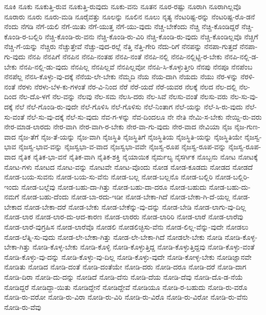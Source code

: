 {ನೂಕಿ
ನೂಕು
ನೂಕುತ್ತಿ-ರುವ
ನೂಕುತ್ತಿ-ರುವುದು
ನೂಕು-ವನು
ನೂತನ
ನೂರ-ರಷ್ಟು
ನೂರಾಗಿ
ನೂರಾಗಿಲ್ಲವೊ
ನೂರಾರು
ನೂರು
ನೂರು-ಮಡಿ
ನೂರೈವತ್ತು
ನೂಲನ್ನು
ನೂಲಿನ
ನೂಲು
ನೃತ್ಯ
ನೆಂಟರಿಷ್ಟ-ರನ್ನು
ನೆಂಟರಿಷ್ಟ-ರೊ-ಡನೆ
ನೆಂದು
ನೆಗಡಿ
ನೆಗೆ-ಯಲಿ
ನೆಗೆ-ಯಿತು
ನೆಗೆ-ಯುತ್ತ
ನೆಗೆ-ಯು-ವುದು
ನೆಚ್ಚ-ಬೇಕೆಂದು
ನೆಚ್ಚಿ
ನೆಚ್ಚಿ-ಕೊಂಡಿದ್ದರೆ
ನೆಚ್ಚಿ-ಕೊಂಡಿ-ರ-ಬಲ್ಲಿರಿ
ನೆಚ್ಚಿ-ಕೊಂಡಿ-ರು-ವನು
ನೆಚ್ಚಿ-ಕೊಂಡಿ-ರು-ವಿರಿ
ನೆಚ್ಚಿ-ಕೊಂಡಿ-ರು-ವುದು
ನೆಚ್ಚಿ-ಕೊಂಡಿಲ್ಲವೊ
ನೆಚ್ಚಿಗೆ
ನೆಚ್ಚಿ-ಗೆ-ಯನ್ನು
ನೆಚ್ಚಿರು
ನೆಚ್ಚುತ್ತೇವೆ
ನೆಚ್ಚು-ವುದ-ರಲ್ಲೆ
ನೆತ್ತಿ
ನೆತ್ತಿ-ಗೇರಿ
ನೆದು-ರಿಗೆ
ನೆನಪನ್ನು
ನೆನಪಾ-ಗುತ್ತದೆ
ನೆನಪಾ-ಗು-ವುದು
ನೆನಪಿ
ನೆನಪಿಗೆ
ನೆನಪಿನ
ನೆನಪಿ-ನಂತಹ
ನೆನಪಿ-ನಂತೆ
ನೆನಪಿ-ನಲ್ಲಿ
ನೆನಪಿ-ನಲ್ಲಿಟ್ಟಿ-ರ-ಬೇಕು
ನೆನಪಿ-ನಲ್ಲಿ-ಡ-ಬೇಕು
ನೆನಪಿ-ನಲ್ಲಿ-ಡು-ವುದು
ನೆನಪಿಲ್ಲ
ನೆನಪಿಲ್ಲವೆ
ನೆನಪಿಲ್ಲವೋ
ನೆನಪಿ-ಸಿ-ಕೊಳ್ಳುತ್ತೀರಿ
ನೆನಪು
ನೆನಪೂ
ನೆನಪೆಂಬ
ನೆನಪೆಲ್ಲ
ನೆನಸಿ-ಕೊಳ್ಳು-ವು-ದಕ್ಕೆ
ನೆನೆಯ-ಲೇ-ಬೇಕು
ನೆಮ್ಮದಿ
ನೆಯ
ನೆಯ-ದಾಗಿ
ನೆಯದು
ನೆಯು
ನೆರ-ಳನ್ನು
ನೆರಳಿ-ನಂತೆ
ನೆರಳು
ನೆರಳು-ಬೆಳ-ಕು-ಗಳಂತೆ
ನೆರ-ವಿ-ನಿಂದ
ನೆರೆ
ನೆರೆ-ಯದೆ
ನೆರೆ-ಯವರ
ನೆಲಕ್ಕೆ
ನೆಲದ
ನೆಲ-ದಲ್ಲಿ
ನೆಲ-ದಿಂದ
ನೆಲ-ದೊ-ಳಗೆ
ನೆಲ-ವನ್ನು
ನೆಲವು
ನೆಲ-ಸಮ
ನೆಲಸಿ-ದರು
ನೆಲ-ಸಿವೆ
ನೆಲಸು-ವಂತೆ
ನೆಲಸು-ವರು
ನೆಲ-ಸು-ವು-ದಕ್ಕೆ
ನೆಲೆ
ನೆಲೆ-ಗೊಂಡಿ-ರು-ವುದೇ
ನೆಲೆ-ಗೊಳಿಸಿ
ನೆಲೆ-ಗೊಳಿಸು
ನೆಲೆ-ನಿಂತಾಗ
ನೆಲೆ-ಯನ್ನು
ನೆಲೆ-ಸಿ-ರು-ವುದು
ನೆಲೆ-ಸು-ವಂತೆ
ನೆಲೆ-ಸು-ವು-ದಕ್ಕೆ
ನೆಲೆ-ಸು-ವುದು
ನೆವ-ಗ-ಳನ್ನು
ನೆವ-ದಿಂದಲೂ
ನೇ
ನೇತಿ
ನೇಮಿ-ಸ-ಬೇಕು
ನೇಯ್ದಿ-ರು-ವರು
ನೇರ-ಮಾಡ-ಲಾರದು
ನೇರ-ವಾಗಿ
ನೇರ-ವಾಗಿ-ರ-ಬೇಕು
ನೇರ-ವಾ-ಗು-ವುದು
ನೇರ-ವಾದ
ನೇವಿಯಾ
ನೈಜ
ನೈಜ-ಗುಣ-ವಾದ
ನೈಜ-ತೆಗೆ
ನೈಜ-ತೆ-ಯನ್ನು
ನೈಜ-ವಾಗಿ
ನೈಜಸ್ಥಿತಿ
ನೈಜಸ್ಥಿತಿಗೆ
ನೈಜಸ್ಥಿತಿಯ
ನೈಜಸ್ಥಿತಿ-ಯನ್ನು
ನೈಜಸ್ಥಿತಿಯೇ
ನೈಜಸ್ವ-ಭಾವ
ನೈಜಸ್ವ-ಭಾವ-ವನ್ನು
ನೈಜಸ್ವಭಾ-ವ-ವಾದ
ನೈಜಸ್ವಭಾ-ವವೇ
ನೈಜಸ್ವ-ರೂಪ
ನೈಜಸ್ವ-ರೂಪ-ವನ್ನು
ನೈಜಸ್ವ-ರೂಪ-ವಾದ
ನೈತಿಕ
ನೈತಿಕ-ಭಾ-ವನೆ
ನೈತಿಕ-ವಾಗಿ
ನೈತಿಕ-ಶಕ್ತಿ
ನೈಯಾಯಿಕ
ನೈರ್ಮಲ್ಯ
ನೈಸರ್ಗಿಕ
ನೊಬ್ಬನು
ನೋಟ
ನೋಟಕ್ಕೆ
ನೋಟ-ಗಳು
ನೋಟದ
ನೋಟ-ವನ್ನು
ನೋಟವೇ
ನೋಟ-ವೊಂದು
ನೋಡ
ನೋಡ-ಕೂಡದು
ನೋಡದ
ನೋಡದೆ
ನೋಡ-ಬಯ-ಸುವನು
ನೋಡ-ಬಯ-ಸು-ವೆನು
ನೋಡ-ಬಲ್ಲ
ನೋಡ-ಬಲ್ಲನೊ
ನೋಡ-ಬಲ್ಲಿರಿ
ನೋಡ-ಬಲ್ಲಿರಿ-ಇಂದು
ನೋಡ-ಬಲ್ಲೆವು
ನೋಡ-ಬಹು-ದಾ-ಗಿತ್ತು
ನೋಡ-ಬಹು-ದಾ-ದರೂ
ನೋಡ-ಬಹುದು
ನೋಡ-ಬಹು-ದು-ನಮಗೆ
ನೋಡ-ಬಹು-ದೆಂದು
ನೋಡ-ಬಾ-ರದು-ಇಡೀ
ನೋಡ-ಬೇಕಾ-ಗಿದೆ
ನೋಡ-ಬೇಕಾ-ಗಿ-ದೆ-ಯಲ್ಲ
ನೋಡ-ಬೇಕಾದ
ನೋಡ-ಬೇಕಾ-ದರೆ
ನೋಡ-ಬೇಕು
ನೋಡ-ಬೇಕೆನ್ನು-ವು-ದನ್ನು
ನೋಡ-ಬೇಡಿ
ನೋಡ-ಲಾಗು-ವು-ದಿಲ್ಲ
ನೋಡ-ಲಾರ
ನೋಡ-ಲಾರ-ದು-ಆದ-ಕಾರಣ
ನೋಡ-ಲಾರರು
ನೋಡ-ಲಾರಿರಿ
ನೋಡ-ಲಾರೆ
ನೋಡ-ಲಾರೆವು
ನೋಡ-ಲಾರೆ-ವುಗ್ರಹಿಸ
ನೋಡ-ಲಾರೆವೊ
ನೋಡಲಿ
ನೋಡಲಿಚ್ಛಿಸು-ವೆನು
ನೋಡ-ಲಿಲ್ಲ-ವೆನ್ನು-ವುದೇ
ನೋಡಲು
ನೋಡ-ಲೆತ್ನಿ-ಸು-ವುದು
ನೋಡ-ಲೇ-ಬೇಕಾ-ಗಿತ್ತು
ನೋಡ-ಲೇ-ಬೇಕಾ-ಗಿದೆ
ನೋಡಲೇ-ಬೇಕು
ನೋಡಿ
ನೋಡಿ-ಕೊಳ್ಳ-ಬೇಕಾ-ಗಿತ್ತು
ನೋಡಿ-ಕೊಳ್ಳ-ಬೇಕು
ನೋಡಿ-ಕೊಳ್ಳಿ
ನೋಡಿ-ಕೊಳ್ಳುತ್ತಿದ್ದ
ನೋಡಿ-ಕೊಳ್ಳುತ್ತಿದ್ದವು
ನೋಡಿ-ಕೊಳ್ಳು-ವಂತೆ
ನೋಡಿ-ಕೊಳ್ಳು-ವು-ದನ್ನು
ನೋಡಿ-ಕೊಳ್ಳು-ವು-ದಿಲ್ಲ
ನೋಡಿ-ಕೊಳ್ಳು-ವುದೇ
ನೋಡಿ-ಕೋಳ್ಳ-ಬೇಕು
ನೋಡಿಜ್ಞಾನವೇ
ನೋಡಿತು
ನೋಡಿದ
ನೋಡಿ-ದಂತೆ
ನೋಡಿ-ದಂತೆಯೇ
ನೋಡಿ-ದರು
ನೋಡಿ-ದರೂ
ನೋಡಿ-ದರೆ
ನೋಡಿ-ದಾಗ
ನೋಡಿ-ದಿರಾ
ನೋಡಿ-ದು-ದನ್ನು
ನೋಡಿದೆ
ನೋಡಿ-ದೆನು
ನೋಡಿ-ದೆಯ
ನೋಡಿ-ದೆವು
ನೋಡಿ-ದೊ-ಡ-ನೆಯೆ
ನೋಡಿದ್ದರೆ
ನೋಡಿದ್ದಾ-ಯಿತು
ನೋಡಿದ್ದೇನೆ
ನೋಡಿದ್ದೇವೆ
ನೋಡಿಯೂ
ನೋಡಿ-ರ-ಬಹುದು
ನೋಡಿ-ರು-ವರೊ
ನೋಡಿ-ರು-ವರೋ
ನೋಡಿ-ರು-ವಿರಾ
ನೋಡಿ-ರು-ವಿರಿ
ನೋಡಿ-ರು-ವಿರೊ
ನೋಡಿ-ರು-ವಿರೋ
ನೋಡಿ-ರು-ವೆನು
ನೋಡಿ-ರು-ವೆವು
}
